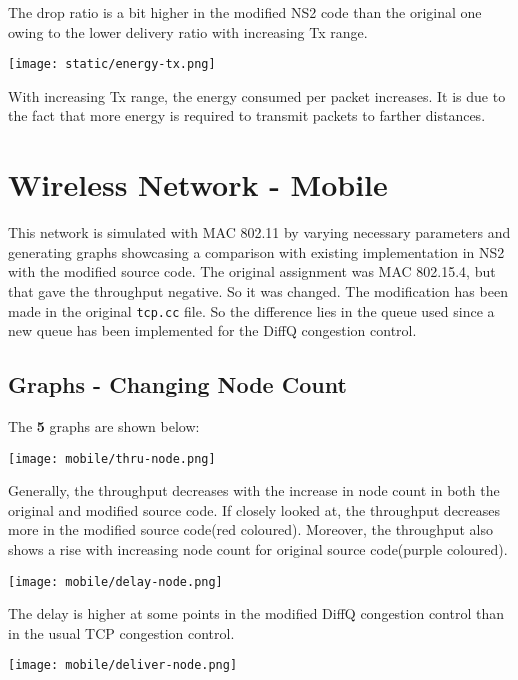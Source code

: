 \documentclass{article}
\begin{document}
The drop ratio is a bit higher in the modified NS2 code than the original one owing to the lower delivery ratio with increasing Tx range.

\begin{center}
    \texttt{[image: static/energy-tx.png]}
\end{center}

With increasing Tx range, the energy consumed per packet increases. It is due to the fact that more energy is required to transmit packets to farther distances.

\section{Wireless Network - Mobile}
This network is simulated with MAC 802.11 by varying necessary parameters and generating graphs showcasing a comparison with existing implementation in NS2 with the modified source code. The original assignment was MAC 802.15.4, but that gave the throughput negative. So it was changed. The modification has been made in the original \texttt{tcp.cc} file. So the difference lies in the queue used since a new queue has been implemented for the DiffQ congestion control.

\subsection{Graphs - Changing Node Count}
The \textbf{5} graphs are shown below:

\begin{center}
    \texttt{[image: mobile/thru-node.png]}
\end{center}

Generally, the throughput decreases with the increase in node count in both the original and modified source code. If closely looked at, the throughput decreases more in the modified source code(red coloured). Moreover, the throughput also shows a rise with increasing node count for original source code(purple coloured).

\begin{center}
    \texttt{[image: mobile/delay-node.png]}
\end{center}

The delay is higher at some points in the modified DiffQ congestion control than in the usual TCP congestion control.

\begin{center}
    \texttt{[image: mobile/deliver-node.png]}
\end{center}
\end{document}
